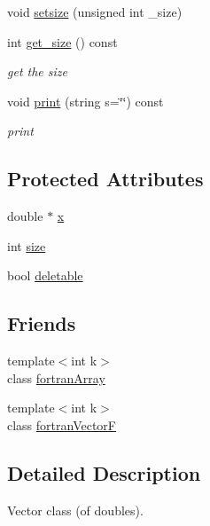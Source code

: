 \begin{DoxyCompactItemize}
\item 
void \hyperlink{classodes_1_1fortranVector_a7f11009e278203c327c93d68e86117c9}{setsize} (unsigned int \-\_\-size)
\item 
int \hyperlink{classodes_1_1fortranVector_a0a9a82f6efc0a9e5ea40dc240eebc800}{get\-\_\-size} () const 
\begin{DoxyCompactList}\small\item\em get the size \end{DoxyCompactList}\item 
void \hyperlink{classodes_1_1fortranVector_a135030af7550fd1e76324303e1fb25e3}{print} (string s=\char`\"{}\char`\"{}) const 
\begin{DoxyCompactList}\small\item\em print \end{DoxyCompactList}\end{DoxyCompactItemize}
\subsection*{Protected Attributes}
\begin{DoxyCompactItemize}
\item 
double $\ast$ \hyperlink{classodes_1_1fortranVector_aa92f26c38f887fca314d4e031b5ebe29}{x}
\item 
int \hyperlink{classodes_1_1fortranVector_a4734531bec0ccbaf24f22c12969580db}{size}
\item 
bool \hyperlink{classodes_1_1fortranVector_ace9b5d1e721b6f82ed090350181557b6}{deletable}
\end{DoxyCompactItemize}
\subsection*{Friends}
\begin{DoxyCompactItemize}
\item 
{\footnotesize template$<$int k$>$ }\\class \hyperlink{classodes_1_1fortranVector_a073cb7f07821b815ad65e098723e8a53}{fortran\-Array}
\item 
{\footnotesize template$<$int k$>$ }\\class \hyperlink{classodes_1_1fortranVector_a6f2443030a60ee3f140d4969edbd2914}{fortran\-Vector\-F}
\end{DoxyCompactItemize}


\subsection{Detailed Description}
Vector class (of doubles). 

